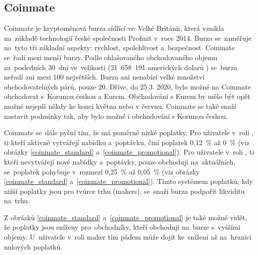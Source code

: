 \documentclass[thesis=B,czech]{FITthesis}[2019/03/21]
\begin{document}
\subsection{Coinmate}
Coinmate je kryptoměnová burza sídlící ve~Velké Británii, která vznikla \linebreak na~základě technologií české společnosti Profinit v~roce 2014. Burza se~zaměřuje na~tyto tři základní aspekty: rychlost, spolehlivost a~bezpečnost. Coinmate se~řadí mezi menší burzy. Podle ohlašovaného obchodovaného objemu za~posledních 30~dní ve~velikosti (21~658~191 amerických dolarů \cite{coin360}) se~burza neřadí ani mezi 100 největších. \cite{coinmarketcap} Burza ani nenabízí velké množství obchodovatelných párů, pouze 20. Dříve, do 25.3. 2020, bylo možné na Coinmate obchodovat s~Korunou českou a Eurem. Obchodování s Eurem by mělo být opět možné nejspíš někdy ke konci května nebo v červnu. Coinmate se také snaží nastavit podmínky tak, aby bylo možné i obchodování s Korunou českou. \cite{coinmate_blog}  

Coinmate se~dále pyšní tím, že má poměrně nízké poplatky. Pro uživatele v~roli , ti kteří aktivně vytvářejí nabídku a~poptávku, činí poplatek 0,12~\% až 0~\% (viz obrázky \ref{coinmate_standard} a~\ref{coinmate_promotional}). Pro uživatele v~roli , ti kteří nevytvářejí nové nabídky a~poptávky, pouze obchodují na~aktuálních, se~poplatek pohybuje v~rozmezí 0,25~\% až 0,05~\% (viz obrázky \ref{coinmate_standard} a~\ref{coinmate_promotional}). Tímto systémem poplatků, kdy nižší poplatky jsou pro tvůrce trhu (makers), se~snaží burza podpořit likviditu na~trhu. \cite{cryptowisser_coinmate} \cite{coinmate_fees}

Z obrázků \ref{coinmate_standard} a~\ref{coinmate_promotional} je také možné vidět, že poplatky jsou sníženy pro~obchodníky, kteří obchodují na~burze s~vyššími objemy. U~uživatele v~roli maker tím pádem může dojít ke~snížení až na~hranici nulových poplatků. \cite{coinmate_fees}
\end{document}
